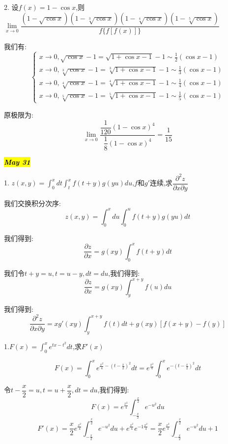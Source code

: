 2. 设$f(x)=1-\cos x$,则$\lim\limits_{x\rightarrow 0}\dfrac{(1-\sqrt{\cos x})(1-\sqrt[3]{\cos x})(1-\sqrt[4]{\cos x})(1-\sqrt[5]{\cos x})}{f\{f[f(x)]\}}$
\begin{solution}
	
	我们有: 
	$$\left\lbrace 
	\begin{array}{l}
		x\rightarrow 0,\sqrt{\cos x}-1=\sqrt{1+\cos x-1}-1\sim \frac{1}{2}(\cos x-1) \\
		x\rightarrow 0,\sqrt[3]{\cos x}-1=\sqrt[3]{1+\cos x-1}-1\sim \frac{1}{3}(\cos x-1)\\
		x\rightarrow 0,\sqrt[4]{\cos x}-1=\sqrt[4]{1+\cos x-1}-1\sim \frac{1}{4}(\cos x-1)\\
		x\rightarrow 0,\sqrt[5]{\cos x}-1=\sqrt[5]{1+\cos x-1}-1\sim \frac{1}{5}(\cos x-1)
	\end{array}
	\right. $$
	
	原极限为: 
	$$\lim\limits_{x\rightarrow 0}\dfrac{\dfrac{1}{120}(1-\cos x)^4}{\dfrac{1}{8}(1-\cos x)^4}=\frac{1}{15}$$
\end{solution}

\hl{\textbf{\textit{May 31}}}

1. $z(x,y)=\int_{0}^{x}dt\int_{t}^{x}f(t+y)g(yu)du$,$f\text{和}g'$连续,求$\dfrac{\partial^2 z}{\partial x\partial y}$
\begin{solution}
	
	我们交换积分次序: 
	$$z(x,y)=\int_{0}^{x}du\int_{0}^{u}f(t+y)g(yu)dt$$
	
	我们得到: 
	$$\dfrac{\partial z}{\partial x}=g(xy)\int_{0}^{x}f(t+y)dt$$
	
	我们令$t+y=u,t=u-y,dt=du$,我们得到: 
	$$\dfrac{\partial z}{\partial x}=g(xy)\int_{y}^{x+y}f(u)du$$
	
	我们得到: 
	$$\dfrac{\partial^2 z}{\partial x\partial y}=xg'(xy)\int_{y}^{x+y}f(t)dt+g(xy)[f(x+y)-f(y)]$$
\end{solution}

1.$F(x)=\int_{0}^{x}e^{tx-t^2}dt$,求$F'(x)$
\begin{solution}
	$$F(x)=\int_{0}^{x}e^{\frac{x^2}{4}-(t-\frac{x}{2})^2}dt=e^{\frac{x^2}{4}}\int_{0}^{x}e^{-(t-\frac{x}{2})^2}dt$$
	
	令$t-\dfrac{x}{2}=u,t=u+\dfrac{x}{2},dt=du$,我们得到: 
	$$F(x)=e^{\frac{x^2}{4}}\int_{-\frac{x}{2}}^{\frac{x}{2}}e^{-u^2}du$$
	$$F'(x)=\frac{x}{2}e^{\frac{x^2}{4}}\int_{-\frac{x}{2}}^{\frac{x}{2}}e^{-u^2}du+e^{\frac{x^2}{4}}e^{-1\frac{x^2}{4}}=\frac{x}{2}e^{\frac{x^2}{4}}\int_{-\frac{x}{2}}^{\frac{x}{2}}e^{-u^2}du+1$$
\end{solution}